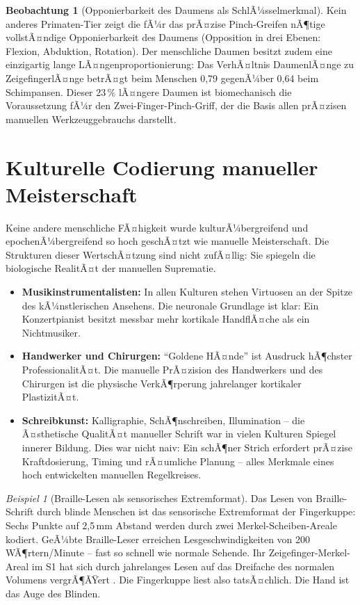 ﻿\documentclass[12pt,a4paper]{report}
\theoremstyle{plain}
\theoremstyle{definition}
\newtheorem{beobachtung}[theorem]{Beobachtung}
\theoremstyle{remark}
\newtheorem{beispiel}[theorem]{Beispiel}
\begin{document}
\begin{beobachtung}[Opponierbarkeit des Daumens als SchlÃ¼sselmerkmal]
Kein anderes Primaten-Tier zeigt die fÃ¼r das prÃ¤zise Pinch-Greifen
nÃ¶tige vollstÃ¤ndige Opponierbarkeit des Daumens (Opposition in drei
Ebenen: Flexion, Abduktion, Rotation). Der menschliche Daumen besitzt
zudem eine einzigartig lange LÃ¤ngenproportionierung: Das VerhÃ¤ltnis
DaumenlÃ¤nge zu ZeigefingerlÃ¤nge betrÃ¤gt beim Menschen 0{,}79 gegenÃ¼ber
0{,}64 beim Schimpansen. Dieser 23\,\% lÃ¤ngere Daumen ist biomechanisch
die Voraussetzung fÃ¼r den Zwei-Finger-Pinch-Griff, der die Basis allen
prÃ¤zisen manuellen Werkzeuggebrauchs darstellt.
\end{beobachtung}

\section{Kulturelle Codierung manueller Meisterschaft}

Keine andere menschliche FÃ¤higkeit wurde kulturÃ¼bergreifend und epochenÃ¼bergreifend
so hoch geschÃ¤tzt wie manuelle Meisterschaft. Die Strukturen dieser WertschÃ¤tzung
sind nicht zufÃ¤llig: Sie spiegeln die biologische RealitÃ¤t der manuellen
Suprematie.

\begin{itemize}
\item \textbf{Musikinstrumentalisten:} In allen Kulturen stehen Virtuosen
  an der Spitze des kÃ¼nstlerischen Ansehens. Die neuronale Grundlage ist
  klar: Ein Konzertpianist besitzt messbar mehr kortikale HandflÃ¤che als
  ein Nichtmusiker.
\item \textbf{Handwerker und Chirurgen:} ``Goldene HÃ¤nde'' ist
  Ausdruck hÃ¶chster ProfessionalitÃ¤t. Die manuelle PrÃ¤zision des Handwerkers
  und des Chirurgen ist die physische VerkÃ¶rperung jahrelanger kortikaler
  PlastizitÃ¤t.
\item \textbf{Schreibkunst:} Kalligraphie, SchÃ¶nschreiben, Illumination --
  die Ã¤sthetische QualitÃ¤t manueller Schrift war in vielen Kulturen
  Spiegel innerer Bildung. Dies war nicht naiv: Ein schÃ¶ner Strich erfordert
  prÃ¤zise Kraftdosierung, Timing und rÃ¤umliche Planung -- alles Merkmale
  eines hoch entwickelten manuellen Regelkreises.
\end{itemize}

\begin{beispiel}[Braille-Lesen als sensorisches Extremformat]
Das Lesen von Braille-Schrift durch blinde Menschen ist das
sensorische Extremformat der Fingerkuppe: Sechs Punkte auf 2,5\,mm Abstand
werden durch zwei Merkel-Scheiben-Areale kodiert. GeÃ¼bte Braille-Leser
erreichen Lesgeschwindigkeiten von 200 WÃ¶rtern/Minute -- fast so schnell
wie normale Sehende. Ihr Zeigefinger-Merkel-Areal im S1 hat sich durch
jahrelanges Lesen auf das Dreifache des normalen Volumens vergrÃ¶ÃŸert
\cite{sterr1998}. Die Fingerkuppe liest also tatsÃ¤chlich. Die Hand ist
das Auge des Blinden.
\end{beispiel}
\end{document}
